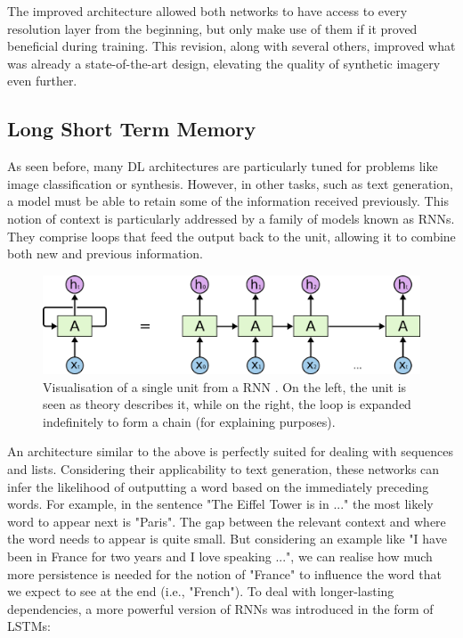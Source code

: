 The improved architecture allowed both networks to have access to every resolution layer from the beginning, but only make use of them if it proved beneficial during training. This revision, along with several others, improved what was already a state-of-the-art design, elevating the quality of synthetic imagery even further.

\subsection{Long Short Term Memory}
\label{subsec:chap2_lstm}
As seen before, many \ac{DL} architectures are particularly tuned for problems like image classification or synthesis. However, in other tasks, such as text generation, a model must be able to retain some of the information received previously. This notion of context is particularly addressed by a family of models known as \ac{RNN}s. They comprise loops that feed the output back to the unit, allowing it to combine both new and previous information.

\begin{figure}[h]
\centering
\includegraphics[width=330pt]{figures/figure_14.pdf}
\caption{Visualisation of a single unit from a \ac{RNN} \cite{lstm_explained}. On the left, the unit is seen as theory describes it, while on the right, the loop is expanded indefinitely to form a chain (for explaining purposes).}
\label{fig:rnn_unit}
\end{figure}

An architecture similar to the above is perfectly suited for dealing with sequences and lists. Considering their applicability to text generation, these networks can infer the likelihood of outputting a word based on the immediately preceding words. For example, in the sentence "The Eiffel Tower is in ..." the most likely word to appear next is "Paris". The gap between the relevant context and where the word needs to appear is quite small. But considering an example like "I have been in France for two years and I love speaking ...", we can realise how much more persistence is needed for the notion of "France" to influence the word that we expect to see at the end (i.e., "French"). To deal with longer-lasting dependencies, a more powerful version of \ac{RNN}s was introduced in the form of \ac{LSTM}s:

